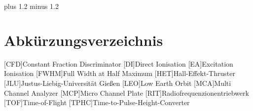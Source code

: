 \documentclass[fontsize=11pt,%
twoside,
BCOR          = 8mm]{scrreprt}
\author{Lorenz Saalmann}
\begin{document}
\font plus 1.2\font
minus 1.2\font






\cleardoublepage

\tableofcontents
\cleardoublepage

\listoffigures
\listoftables
\section*{\LARGE Abkürzungsverzeichnis}
\begin{acronym}
  [CFD]{\dotfill Constant Fraction Discriminator}  
  [DI]{\dotfill Direct Ionisation}  
  [EA]{\dotfill Excitation Ionisation}  
  [FWHM]{\dotfill Full Width at Half Maximum}  
  [HET]{\dotfill Hall-Effekt-Thruster}  
  [JLU]{\dotfill Justus-Liebig-Universit\"{a}t Gie{\ss}en}  
  [LEO]{\dotfill Low Earth Orbit}  
  [MCA]{\dotfill Multi Channel Analyzer}  
  [MCP]{\dotfill Micro Channel Plate}  
  [RIT]{\dotfill Radiofrequenzionentriebwerk}  
  [TOF]{\dotfill Time-of-Flight}  
  [TPHC]{\dotfill Time-to-Pulse-Height-Converter}  


\end{acronym}
\cleardoublepage

\onehalfspacing

\cleardoublepage


\cleardoublepage

\cleardoublepage

\cleardoublepage

\cleardoublepage

\cleardoublepage


\fontsize{12pt}{12pt}\selectfont

\renewcommand\bibname{Literaturverzeichnis}
\clearpage
{}
{}

\printbibliography
\end{document}
